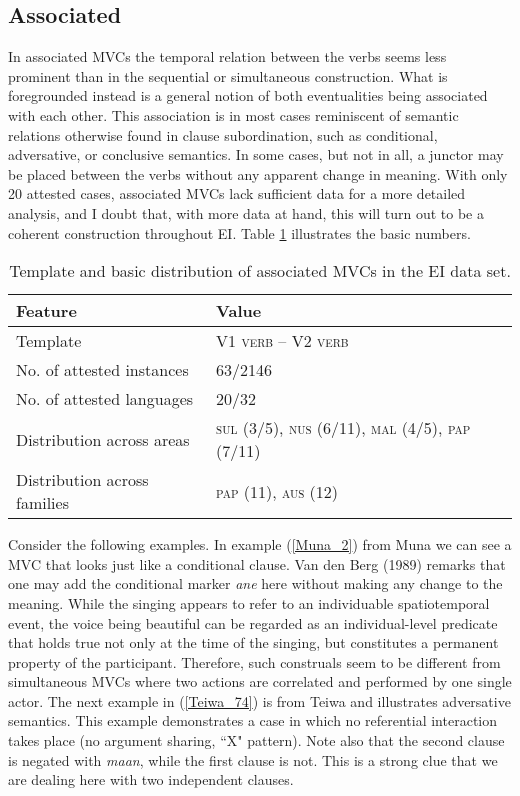 \subsection{Associated}

In associated MVCs the temporal relation between the verbs seems less prominent than in the sequential or simultaneous construction. What is foregrounded instead is a general notion of both eventualities being associated with each other. This association is in most cases reminiscent of semantic relations otherwise found in clause subordination, such as conditional, adversative, or conclusive semantics. In some cases, but not in all, a junctor may be placed between the verbs without any apparent change in meaning. With only 20 attested cases, associated MVCs lack sufficient data for a more detailed analysis, and I doubt that, with more data at hand, this will turn out to be a coherent construction throughout EI. Table \ref{table:associated} illustrates the basic numbers.

\begin{table}


\begin{tabular}{ll}
\lsptoprule
Feature&Value\tabularnewline
\hline
Template& V1 \textsc{verb} -- V2 \textsc{verb}\tabularnewline
No. of attested instances& 63/2146 \tabularnewline
No. of attested languages& 20/32 \tabularnewline
Distribution across areas& \textsc{sul} (3/5), \textsc{nus} (6/11), \textsc{mal} (4/5), \textsc{pap} (7/11) \tabularnewline
Distribution across families& \textsc{pap} (11), \textsc{aus} (12) \tabularnewline
\hline
\end{tabular}
\caption[Template and basic distribution of associated MVCs]{Template and basic distribution of associated MVCs in the EI data set.}
\label{table:associated}
\end{table}


Consider the following examples. In example (\ref{Muna_2}) from Muna we can see a MVC that looks just like a conditional clause. Van den Berg (1989) remarks that one may add the conditional marker \textit{ane} here without making any change to the meaning. While the singing appears to refer to an individuable spatiotemporal event, the voice being beautiful can be regarded as an individual-level predicate that holds true not only at the time of the singing, but constitutes a permanent property of the participant. Therefore, such construals seem to be different from simultaneous MVCs where two actions are correlated and performed by one single actor. The next example in (\ref{Teiwa_74}) is from Teiwa and illustrates adversative semantics. This example  demonstrates a case in which no referential interaction takes place (no argument sharing, ``X" pattern). Note also that the second clause is negated with \textit{maan}, while the first clause is not. This is a strong clue that we are dealing here with two independent clauses.

